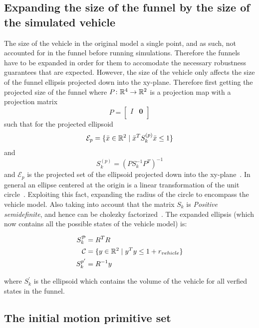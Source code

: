 \subsection{Expanding the size of the funnel by the size of the simulated
  vehicle}

The size of the vehicle in the original model a single point, and as such, not
accounted for in the funnel before running simulations. Therefore the funnels
have to be expanded in order for them to accomodate the necessary robustness
guarantees that are expected. However, the size of the vehicle only affects the
size of the funnel ellipsis projected down into the xy-plane. Therefore first
getting the projected size of the funnel where \(P \colon \mathbb{R}^4 \rightarrow
\mathbb{R}^2\) is a projection map with a projection matrix
\[
  P =
  \begin{bmatrix}
    I & \mathbf{0} \\
  \end{bmatrix}
\]
such that for the projected ellipsoid
\[
  \mathcal{E}_{p} = \lbrace\bar{x} \in \mathbb{R}^{2} \mid {\bar{x}}^{T}S_{k}^{(p)}\bar{x}
    \leq 1\rbrace
\]
and
\[
  S_{k}^{(p)} = \left( PS_{k}^{-1}P^T \right)^{-1}
\]
and \(\mathcal{E}_{p}\) is the projected set of the ellipsoid projected down
into the xy-plane~\cite{majumdarFunnelLibrariesRealtime2017}. In general an
ellipse centered at the origin is a linear transformation of the unit
circle~\cite{lay2005linear}. Exploiting this fact, expanding the radius of the
circle to encompass the vehicle model. Also taking into account that the matrix
\(S_{k}\) is \textit{Positive semidefinite}, and hence can be cholezky
factorized~\cite{lay2005linear}. The expanded ellipsis (which now contains all
the possible states of the vehicle model) is:

\begin{align*}
  S_{k}^{\mathcal{P}} &= R^{T}R \\
  \mathcal{C} &= \lbrace y \in \mathbb{R}^2 \mid y^{T}y \leq 1 + r_{vehicle}\rbrace \\
  S_{k}^{p'} &= R^{-1}y \\
\end{align*}

where \(S_{k}^{'}\) is the ellipsoid which contains the volume of the vehicle
for all verfied states in the funnel.

\subsection{The initial motion primitive set}

